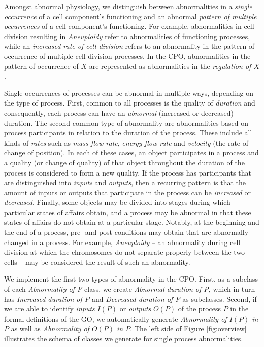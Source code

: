 \documentclass{bioinfo}
\begin{document}
Amongst abnormal physiology, we distinguish between abnormalities in a
{\em single occurrence} of a cell component's functioning and an
abnormal {\em pattern of multiple occurrences} of a cell component's
functioning. For example, abnormalities in cell division resulting in
{\em Aneuploidy} refer to abnormalities of functioning processes,
while an {\em increased rate of cell division} refers to an
abnormality in the pattern of occurrence of multiple cell division
processes. In the CPO, abnormalities in the pattern of occurrence of
$X$ are represented as abnormalities in the {\em regulation of $X$}.

Single occurrences of processes can be abnormal in multiple ways,
depending on the type of process.
%
First, common to all processes is the quality of {\em duration} and
consequently, each process can have an {\em abnormal} (increased or
decreased) duration. The second common type of abnormality are
abnormalities based on process participants in relation to the
duration of the process. These include all kinds of {\em rates} such
as {\em mass flow rate}, {\em energy flow rate} and {\em velocity}
(the rate of change of position). In each of these cases, an object
participates in a process and a quality (or change of quality) of that
object throughout the duration of the process is considered to form a
new quality. If the process has participants that are distinguished
into {\em inputs} and {\em outputs}, then a recurring pattern is that
the amount of inputs or outputs that participate in the process can be
{\em increased} or {\em decreased}.  Finally, some objects may be
divided into stages during which particular states of affairs obtain,
and a process may be abnormal in that these states of affairs do not
obtain at a particular stage. Notably, at the beginning and the end of
a process, pre- and post-conditions may obtain that are abnormally
changed in a process. For example, {\em Aneuploidy} -- an abnormality
during cell division at which the chromosomes do not separate properly
between the two cells -- may be considered the result of such an
abnormality.

We implement the first two types of abnormality in the CPO. First, as
a subclass of each {\em Abnormality of P} class, we create {\em
  Abnormal duration of P}, which in turn has {\em Increased duration
  of P} and {\em Decreased duration of P} as subclasses. Second, if we
are able to identify {\em inputs} $I(P)$ or {\em outputs} $O(P)$ of
the process $P$ in the formal definitions of the GO, we automatically
generate {\em Abnormality of $I(P)$ in $P$} as well as {\em
  Abnormality of $O(P)$ in $P$}.  The left side of Figure
\ref{fig:overview} illustrates the schema of classes we generate for
single process abnormalities.
\end{document}
